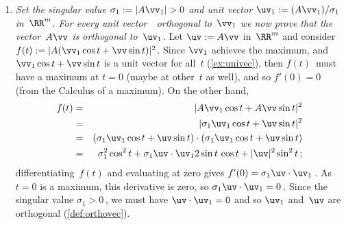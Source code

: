 \begin{enumerate}
\item \emph{Set the singular value \(\sigma_1:=|A\vv_1|>0\) and unit vector \(\uv_1:=(A\vv_1)/\sigma_1\) in~\(\RR^m\). 
For every unit vector~\vv\ orthogonal to~\(\vv_1\) we now prove that the vector~\(A\vv\) is orthogonal to~\(\uv_1\).}
Let \(\uv:=A\vv\) in~\(\RR^m\) and consider \(f(t):=|A(\vv_1\cos t+\vv\sin t)|^2\).
Since \(\vv_1\) achieves the maximum, and \(\vv_1\cos t+\vv\sin t\) is a unit vector for all~\(t\) (\cref{ex:univec}), then \(f(t)\)~must have a maximum at \(t=0\) (maybe at other~\(t\) as well), and so \(f'(0)=0\) (from the Calculus of a maximum).
On the other hand, 
\begin{eqnarray*}
f(t)&=&|A\vv_1\cos t+A\vv\sin t|^2
\\&=&|\sigma_1\uv_1\cos t+\uv\sin t|^2
\\&=&(\sigma_1\uv_1\cos t+\uv\sin t)\cdot(\sigma_1\uv_1\cos t+\uv\sin t)
\\&=&\sigma_1^2\cos^2 t+\sigma_1\uv\cdot\uv_12\sin t\,\cos t+|\uv|^2\sin^2 t
\,;
\end{eqnarray*}
differentiating~\(f(t)\) and evaluating at zero gives
\(f'(0)=\sigma_1\uv\cdot\uv_1\)\,.
As \(t=0\) is a maximum, this derivative is zero, so \(\sigma_1\uv\cdot\uv_1=0\)\,.
Since the singular value \(\sigma_1>0\)\,, we must have \(\uv\cdot\uv_1=0\) and so \(\uv_1\) and~\(\uv\) are orthogonal (\cref{def:orthovec}).


\end{enumerate}
